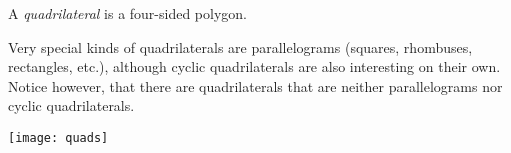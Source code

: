 \documentclass{article}
\begin{document}
A \emph{quadrilateral} is a  four-sided polygon.


Very special kinds of quadrilaterals are parallelograms (squares, rhombuses, rectangles, etc.), although cyclic quadrilaterals are also interesting on their own.
Notice however, that there are quadrilaterals that are neither parallelograms nor cyclic quadrilaterals.

\begin{center}
\texttt{[image: quads]}
\end{center}
\end{document}
